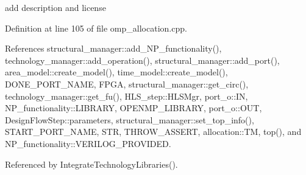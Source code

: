 add description and license 

Definition at line 105 of file omp\+\_\+allocation.\+cpp.



References structural\+\_\+manager\+::add\+\_\+\+N\+P\+\_\+functionality(), technology\+\_\+manager\+::add\+\_\+operation(), structural\+\_\+manager\+::add\+\_\+port(), area\+\_\+model\+::create\+\_\+model(), time\+\_\+model\+::create\+\_\+model(), D\+O\+N\+E\+\_\+\+P\+O\+R\+T\+\_\+\+N\+A\+ME, F\+P\+GA, structural\+\_\+manager\+::get\+\_\+circ(), technology\+\_\+manager\+::get\+\_\+fu(), H\+L\+S\+\_\+step\+::\+H\+L\+S\+Mgr, port\+\_\+o\+::\+IN, N\+P\+\_\+functionality\+::\+L\+I\+B\+R\+A\+RY, O\+P\+E\+N\+M\+P\+\_\+\+L\+I\+B\+R\+A\+RY, port\+\_\+o\+::\+O\+UT, Design\+Flow\+Step\+::parameters, structural\+\_\+manager\+::set\+\_\+top\+\_\+info(), S\+T\+A\+R\+T\+\_\+\+P\+O\+R\+T\+\_\+\+N\+A\+ME, S\+TR, T\+H\+R\+O\+W\+\_\+\+A\+S\+S\+E\+RT, allocation\+::\+TM, top(), and N\+P\+\_\+functionality\+::\+V\+E\+R\+I\+L\+O\+G\+\_\+\+P\+R\+O\+V\+I\+D\+ED.



Referenced by Integrate\+Technology\+Libraries().

